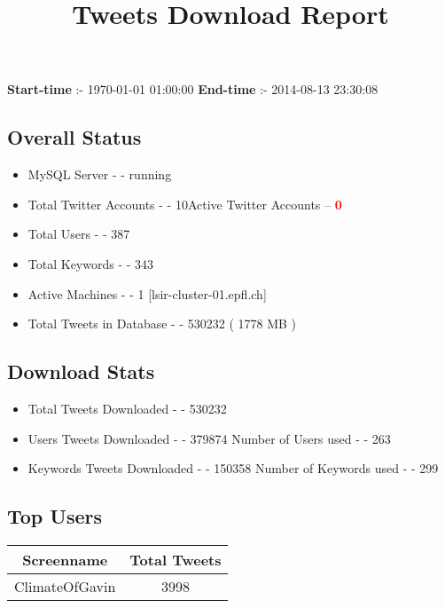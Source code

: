 \documentclass{article}\usepackage[T1]{fontenc}
\begin{document}
\title{\textbf{Tweets Download Report}}
               \date{}
                \maketitle
               \centerline{\textbf{Start-time} :- 1970-01-01 01:00:00 \hspace{40pt} \textbf{End-time} :- 2014-08-13 23:30:08}               \subsection*{Overall Status}                \begin{itemize}                \item MySQL Server - - running               \item Total Twitter Accounts - - 10\newline Active Twitter Accounts -- \textcolor{red}{\textbf{0}}               \item Total Users - - 387               \item Total Keywords - - 343               \item Active Machines - - 1 [lsir-cluster-01.epfl.ch]               \item Total Tweets in Database - - 530232 ( 1778 MB )               \end{itemize}               \subsection*{Download Stats}                \begin{itemize}                \item Total Tweets Downloaded - - 530232               \item Users Tweets Downloaded - - 379874 \newline Number of Users used - - 263               \item Keywords Tweets Downloaded - - 150358 \newline Number of Keywords used - - 299              \end{itemize}              \subsection*{Top Users}\begin{tabular}{|c|c|}         \hline         Screenname & Total Tweets \\ 
 \hline
ClimateOfGavin & 3998\\ 

\end{tabular}
\end{document}
